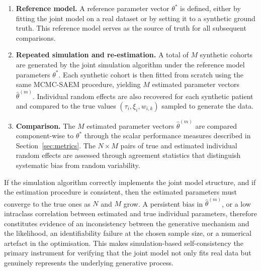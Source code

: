 \documentclass{rapportCS}
\begin{document}
\begin{enumerate}
  \item \textbf{Reference model.} A reference parameter vector $\theta^{*}$ is defined, either by fitting the joint model on a real dataset or by setting it to a synthetic ground truth. This reference model serves as the source of truth for all subsequent comparisons.
  \item \textbf{Repeated simulation and re-estimation.} A total of $M$ synthetic cohorts are generated by the joint simulation algorithm under the reference model parameters $\theta^{*}$. Each synthetic cohort is then fitted from scratch using the same MCMC-SAEM procedure, yielding $M$ estimated parameter vectors $\hat{\theta}^{(m)}$. Individual random effects are also recovered for each synthetic patient and compared to the true values $(\tau_i, \xi_i, w_{i,k})$ sampled to generate the data.
  \item \textbf{Comparison.} The $M$ estimated parameter vectors $\hat{\theta}^{(m)}$ are compared component-wise to $\theta^{*}$ through the scalar performance measures described in Section~\ref{sec:metrics}. The $N \times M$ pairs of true and estimated individual random effects are assessed through agreement statistics that distinguish systematic bias from random variability.
\end{enumerate} 

If the simulation algorithm correctly implements the joint model structure, and if the estimation procedure is consistent, then the estimated parameters must converge to the true ones as $N$ and $M$ grow. A persistent bias in $\hat{\theta}^{(m)}$, or a low intraclass correlation between estimated and true individual parameters, therefore constitutes evidence of an inconsistency between the generative mechanism and the likelihood, an identifiability failure at the chosen sample size, or a numerical artefact in the optimisation. This makes simulation-based self-consistency the primary instrument for verifying that the joint model not only fits real data but genuinely represents the underlying generative process.
\end{document}
